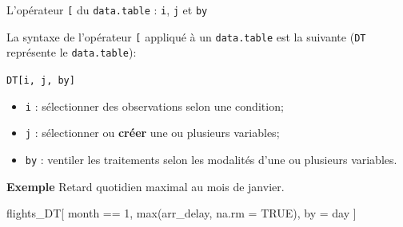 \documentclass[12pt,ignorenonframetext,]{beamer}
\newenvironment{Shaded}{}{}
\newcommand{\DataTypeTok}[1]{#1}
\newcommand{\DecValTok}[1]{#1}
\newcommand{\KeywordTok}[1]{\textcolor[rgb]{0.00,0.00,1.00}{#1}}
\newcommand{\NormalTok}[1]{#1}
\newcommand{\OperatorTok}[1]{#1}
\newcommand{\OtherTok}[1]{\textcolor[rgb]{1.00,0.25,0.00}{#1}}
\newcommand{\StringTok}[1]{\textcolor[rgb]{0.00,0.50,0.50}{#1}}
\providecommand{\tightlist}{%
  \setlength{\itemsep}{0pt}\setlength{\parskip}{0pt}}
\renewenvironment{Shaded}{\begin{snugshade}}{\end{snugshade}}
\newcommand{\intertitre}[1]{\textcolor{redInsee}{\textbf{#1}}}
\begin{document}
\begin{frame}[fragile]{L’opérateur \texttt{{[}} du \texttt{data.table} :
\texttt{i}, \texttt{j} et \texttt{by}}
\protect\hypertarget{loperateur-du-data.table-i-j-et-by}{}

La syntaxe de l’opérateur \texttt{{[}} appliqué à un \texttt{data.table}
est la suivante (\texttt{DT} représente le \texttt{data.table}):

\pause \centering \large

\texttt{DT{[}i,\ j,\ by{]}}

\raggedright \normalsize

\begin{itemize}
\tightlist
\item
  \texttt{i} : sélectionner des observations selon une condition;
\item
  \texttt{j} : sélectionner ou \textbf{créer} une ou plusieurs
  variables;
\item
  \texttt{by} : ventiler les traitements selon les modalités d’une ou
  plusieurs variables.
\end{itemize}

\pause \bigskip

\pause \intertitre{Exemple} Retard quotidien maximal au mois de janvier.

\small

\begin{Shaded}
\begin{Highlighting}[]
\NormalTok{flights_DT[}
\NormalTok{  month }\OperatorTok{==}\StringTok{ }\DecValTok{1}\NormalTok{, }\KeywordTok{max}\NormalTok{(arr_delay, }\DataTypeTok{na.rm =} \OtherTok{TRUE}\NormalTok{), by =}\StringTok{ }\NormalTok{day}
\NormalTok{]}
\end{Highlighting}
\end{Shaded}

\end{frame}
\end{document}
